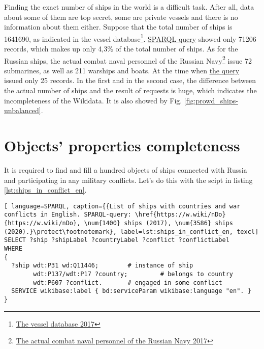 Finding the exact number of ships in the world is a difficult task. After all, data about some of them are top secret, some are private vessels and there is no information about them either. Suppose that the total number of ships is \num{1641690}, as indicated in the vessel database\footnote{\href{http://www.fleetmon.com/vessels}{The vessel database 2017}}. \href{https://w.wiki/koU}{SPARQL-query} showed only \num{71206} records, which makes up only 4,3\%  of the total number of ships. As for the Russian ships, the actual combat naval personnel of the Russian Navy\footnote{\href{http://russianships.info/today/}{The actual combat naval personnel of the Russian Navy 2017}} issue 72 submarines, as well as 211 warships and boats. At the time when \href{https://w.wiki/koS}{the query} issued only 25 records. In the first and in the second case, the difference between the actual number of ships and the result of requests is huge, which indicates the incompleteness of the Wikidata. It is also showed by Fig. \ref{fig:prowd_ships-unbalanced}.



\section{Objects' properties completeness}

It is required to find and fill a hundred objects of ships connected with Russia and participating in any military conflicts. Let's do this with the scipt in listing \ref{lst:ships_in_conflict_en}.
\begin{lstlisting}[ language=SPARQL, caption={{List of ships with countries and war conflicts in English. SPARQL-query: \href{https://w.wiki/nDo}{https://w.wiki/nDo}, \num{1400} ships (2017), \num{3586} ships (2020).}\protect\footnotemark}, label=lst:ships_in_conflict_en, texcl]
SELECT ?ship ?shipLabel ?countryLabel ?conflict ?conflictLabel
WHERE
{
  ?ship wdt:P31 wd:Q11446;        # instance of ship
        wdt:P137/wdt:P17 ?country;         # belongs to country
        wdt:P607 ?conflict.       # engaged in some conflict
  SERVICE wikibase:label { bd:serviceParam wikibase:language "en". }
}
\end{lstlisting}


